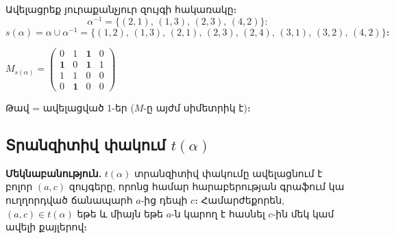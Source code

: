 \documentclass[12pt, a4paper]{article}
\begin{document}
Ավելացրեք յուրաքանչյուր զույգի հակառակը։
\[
  \alpha^{-1} = \{(2,1),\,(1,3),\,(2,3),\,(4,2)\}:
\]
\[
  \boxed{s(\alpha) = \alpha \cup \alpha^{-1}
  = \{(1,2),\,(1,3),\,(2,1),\,(2,3),\,(2,4),\,(3,1),\,(3,2),\,(4,2)\}։}
\]

\begin{center}
\begin{minipage}{0.45\textwidth}\centering
{}
\end{minipage}%
\begin{minipage}{0.45\textwidth}\centering
$M_{s(\alpha)} = \begin{pmatrix}
  0 & 1 & \mathbf{1} & 0 \\
  \mathbf{1} & 0 & \mathbf{1} & 1 \\
  1 & 1 & 0 & 0 \\
  0 & \mathbf{1} & 0 & 0
\end{pmatrix}$

{\small\color{newEdge} Թավ = ավելացված 1-եր ($M$-ը այժմ սիմետրիկ է)։}
\end{minipage}
\end{center}

\subsection*{Տրանզիտիվ փակում $t(\alpha)$}

\textbf{Մեկնաբանություն.}\; $t(\alpha)$ տրանզիտիվ փակումը ավելացնում է բոլոր $(a,c)$ զույգերը, որոնց համար հարաբերության գրաֆում կա ուղղորդված ճանապարհ $a$-ից դեպի $c$։ Համարժեքորեն, $(a,c) \in t(\alpha)$ եթե և միայն եթե $a$-ն կարող է հասնել $c$-ին մեկ կամ ավելի քայլերով։
\end{document}
